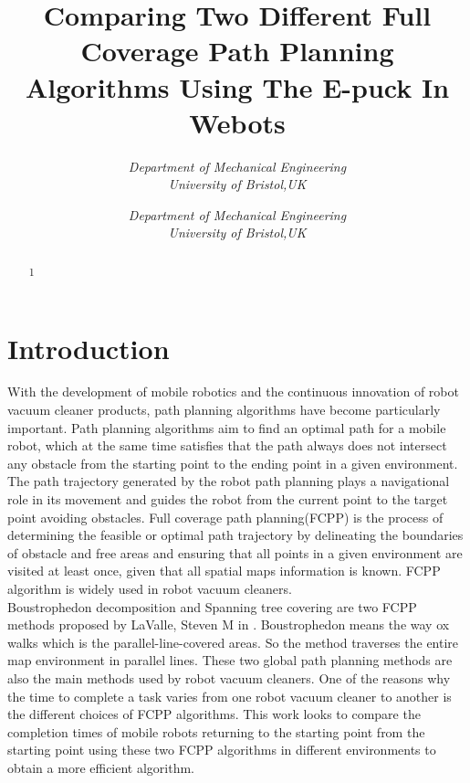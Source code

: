 \documentclass[conference]{IEEEtran}
\begin{document}
\title{Comparing Two Different Full Coverage Path Planning Algorithms Using The E-puck In Webots}

\author{
    \textit{Department of Mechanical Engineering}\\
    \textit{University of Bristol,UK}
    \and
    \textit{Department of Mechanical Engineering}\\
    \textit{University of Bristol,UK}
}

\maketitle

\begin{abstract}
1
\end{abstract}


\section{Introduction}
With the development of mobile robotics and the continuous innovation of robot vacuum cleaner products, path planning algorithms have become particularly important. Path planning algorithms aim to find an optimal path for a mobile robot, which at the same time satisfies that the path always does not intersect any obstacle from the starting point to the ending point in a given environment. The path trajectory generated by the robot path planning plays a navigational role in its movement and guides the robot from the current point to the target point avoiding obstacles. Full coverage path planning(FCPP) is the process of determining the feasible or optimal path trajectory by delineating the boundaries of obstacle and free areas and ensuring that all points in a given environment are visited at least once, given that all spatial maps information is known. FCPP algorithm is widely used in robot vacuum cleaners.\\
Boustrophedon decomposition and Spanning tree covering are two FCPP methods proposed by LaValle, Steven M in \cite{lavalle2006planning}. Boustrophedon means the way ox walks which is the parallel-line-covered areas. So the method traverses the entire map environment in parallel lines. These two global path planning methods are also the main methods used by robot vacuum cleaners. One of the reasons why the time to complete a task varies from one robot vacuum cleaner to another is the different choices of FCPP algorithms. This work looks to compare the completion times of mobile robots returning to the starting point from the starting point using these two FCPP algorithms in different environments to obtain a more efficient algorithm.
\end{document}
